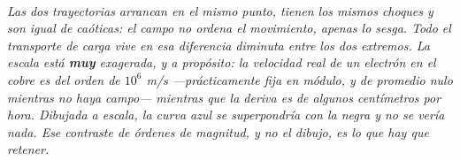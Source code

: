 \begin{center}
\begin{tikzpicture}[scale=1]
\end{tikzpicture}\\[0.5em]
{\small\itshape Las dos trayectorias arrancan en el mismo punto, tienen los
mismos choques y son igual de caóticas: el campo no ordena el movimiento, apenas
lo sesga. Todo el transporte de carga vive en esa diferencia diminuta entre los
dos extremos. La escala está \textbf{muy} exagerada, y a propósito: la velocidad
real de un electrón en el cobre es del orden de $10^{6}$ m/s ---prácticamente
fija en módulo, y de promedio nulo mientras no haya campo--- mientras que la
deriva es de algunos centímetros por hora. Dibujada a escala, la curva azul se
superpondría con la negra y no se vería nada. Ese contraste de órdenes de
magnitud, y no el dibujo, es lo que hay que retener.}
\end{center}
